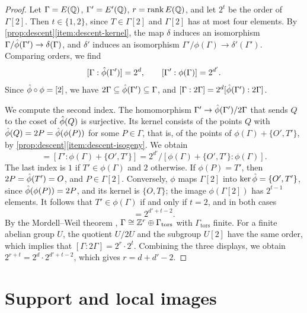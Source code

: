 \begin{proof}
Let $\Gamma=E(\mathbb Q)$, $\Gamma'=E'(\mathbb Q)$, $r=\operatorname{rank} E(\mathbb Q)$, and let $2^t$ be the order of $\Gamma[2]$. Then $t\in\{1,2\}$, since $T\in\Gamma[2]$ and $\Gamma[2]$ has at most four elements. By \cref{prop:descent}\ref{item:descent-kernel}, the map $\delta$ induces an isomorphism $\Gamma/\hat\phi(\Gamma')\to\delta(\Gamma)$, and $\delta'$ induces an isomorphism $\Gamma'/\phi(\Gamma)\to\delta'(\Gamma')$. Comparing orders, we find
\begin{equation}\label{eq:rank-indices}
[\Gamma:\hat\phi(\Gamma')]=2^d,\qquad[\Gamma':\phi(\Gamma)]=2^{d'}.
\end{equation}
Since $\hat\phi\circ\phi=[2]$, we have $2\Gamma\subseteq\hat\phi(\Gamma')\subseteq\Gamma$, and $[\Gamma:2\Gamma]=2^d[\hat\phi(\Gamma'):2\Gamma]$.

We compute the second index. The homomorphism $\Gamma'\to\hat\phi(\Gamma')/2\Gamma$ that sends $Q$ to the coset of $\hat\phi(Q)$ is surjective. Its kernel consists of the points $Q$ with $\hat\phi(Q)=2P=\hat\phi(\phi(P))$ for some $P\in\Gamma$, that is, of the points of $\phi(\Gamma)+\{O',T'\}$, by \cref{prop:descent}\ref{item:descent-isogeny}. We obtain
\begin{equation}
[\dual(\Gamma'):2\Gamma]=[\Gamma':\phi(\Gamma)+\{O',T'\}]=2^{d'}/[\phi(\Gamma)+\{O',T'\}:\phi(\Gamma)].
\end{equation}
The last index is $1$ if $T'\in\phi(\Gamma)$ and $2$ otherwise. If $\phi(P)=T'$, then $2P=\hat\phi(T')=O$, and $P\in\Gamma[2]$. Conversely, $\phi$ maps $\Gamma[2]$ into $\ker\hat\phi=\{O',T'\}$, since $\hat\phi(\phi(P))=2P$, and its kernel is $\{O,T\}$; the image $\phi(\Gamma[2])$ has $2^{t-1}$ elements. It follows that $T'\in\phi(\Gamma)$ if and only if $t=2$, and in both cases
\begin{equation}
[\dual(\Gamma'):2\Gamma]=2^{d'+t-2}.
\end{equation}
By the Mordell--Weil theorem \cite[Theorem~VIII.6.7]{SilvermanAEC}, $\Gamma\cong\mathbb Z^r\oplus\Gamma_{\mathrm{tors}}$ with $\Gamma_{\mathrm{tors}}$ finite. For a finite abelian group $U$, the quotient $U/2U$ and the subgroup $U[2]$ have the same order, which implies that $[\Gamma:2\Gamma]=2^r\cdot2^t$. Combining the three displays, we obtain $2^{r+t}=2^d\cdot2^{d'+t-2}$, which gives $r=d+d'-2$.
\end{proof}

\section{Support and local images}\label{sec:descent-local}

